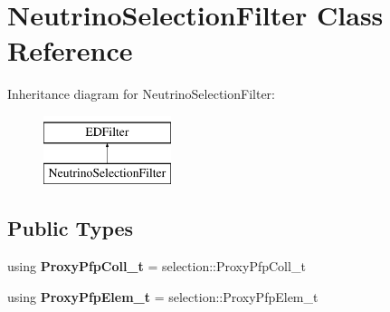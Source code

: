 \hypertarget{classNeutrinoSelectionFilter}{}\section{Neutrino\+Selection\+Filter Class Reference}
\label{classNeutrinoSelectionFilter}
Inheritance diagram for Neutrino\+Selection\+Filter\+:\begin{figure}[H]
\begin{center}
\leavevmode
\includegraphics[height=2.000000cm]{classNeutrinoSelectionFilter}
\end{center}
\end{figure}
\subsection*{Public Types}
\begin{DoxyCompactItemize}
\item 
using {\bfseries Proxy\+Pfp\+Coll\+\_\+t} = selection\+::\+Proxy\+Pfp\+Coll\+\_\+t\hypertarget{classNeutrinoSelectionFilter_a7f4b9d53b7df6e6dec6227a60844f112}{}\label{classNeutrinoSelectionFilter_a7f4b9d53b7df6e6dec6227a60844f112}

\item 
using {\bfseries Proxy\+Pfp\+Elem\+\_\+t} = selection\+::\+Proxy\+Pfp\+Elem\+\_\+t\hypertarget{classNeutrinoSelectionFilter_a95a27c35e4604bf0a4feb59231d4e984}{}\label{classNeutrinoSelectionFilter_a95a27c35e4604bf0a4feb59231d4e984}

\end{DoxyCompactItemize}
